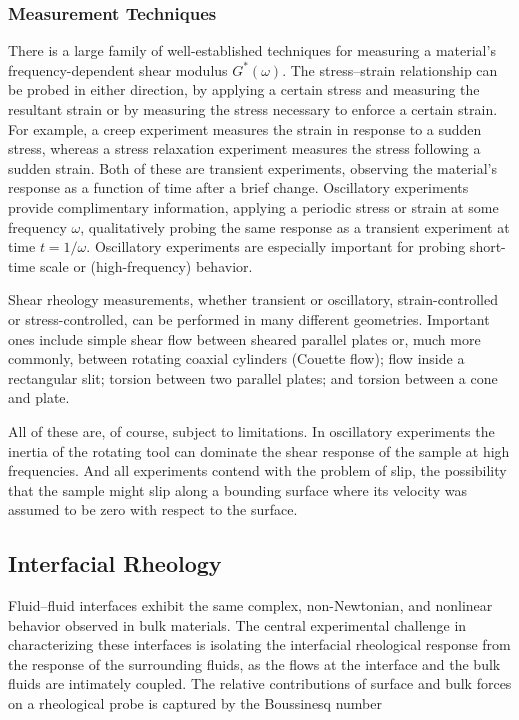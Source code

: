 \subsubsection{Measurement Techniques}

There is a large family of well-established techniques for measuring a material's frequency-dependent shear modulus $G^*(\omega)$. The stress--strain relationship can be probed in either direction, by applying a certain stress and measuring the resultant strain or by measuring the stress necessary to enforce a certain strain. For example, a creep experiment measures the strain in response to a sudden stress, whereas a stress relaxation experiment measures the stress following a sudden strain. Both of these are transient experiments, observing the material's response as a function of time after a brief change. Oscillatory experiments provide complimentary information, applying a periodic stress or strain at some frequency $\omega$, qualitatively probing the same response as a transient experiment at time $t=1/\omega$. Oscillatory experiments are especially important for probing short-time scale or (high-frequency) behavior.

Shear rheology measurements, whether transient or oscillatory, strain-controlled or stress-controlled, can be performed in many different geometries. Important ones include simple shear flow between sheared parallel plates or, much more commonly, between rotating coaxial cylinders (Couette flow); flow inside a rectangular slit; torsion between two parallel plates; and torsion between a cone and plate.

All of these are, of course, subject to limitations. In oscillatory experiments the inertia of the rotating tool can dominate the shear response of the sample at  high frequencies. And all experiments contend with the problem of slip, the possibility that the sample might slip along a bounding surface where its velocity was assumed to be zero with respect to the surface.

\subsection{Interfacial Rheology\label{sec:interfacial-rheology}}

Fluid--fluid interfaces exhibit the same complex, non-Newtonian, and nonlinear behavior observed in bulk materials. The central experimental challenge in characterizing these interfaces is isolating the interfacial rheological response from the response of the surrounding fluids, as the flows at the interface and the bulk fluids are intimately coupled\cite{Fuller2011}. The relative contributions of surface and bulk forces on a rheological probe is captured by the Boussinesq number\cite{Derkach2009}

